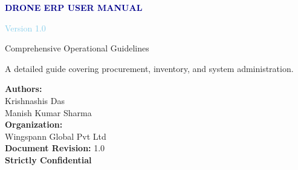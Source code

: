 \documentclass[11pt,a4paper]{article}
\begin{document}
\begin{titlepage}
    \centering
    \vspace*{2cm}
    {\Huge\bfseries\textcolor{darkblue}{DRONE ERP USER MANUAL}\par}
    \vspace{0.5cm}
    {\LARGE\textcolor{skyblue}{Version 1.0}\par}
    \vspace{0.3cm}
    {\large\textcolor{codegray}{Comprehensive Operational Guidelines}\par}
    \vspace{2cm}
    {\large A detailed guide covering procurement, inventory, and system administration.\par}
    \vspace{3cm}

    {\normalsize
        \textbf{Authors:}\\
        Krishnashis Das\\
        Manish Kumar Sharma\\[1em]
        \textbf{Organization:}\\
        Wingspann Global Pvt Ltd\\[1em]
        \textbf{Document Revision:} 1.0\\
        \vspace{0.8cm}
        \LARGE\textcolor{alertred}{\textbf{Strictly Confidential}}
    }
\end{titlepage}

\newpage
\tableofcontents
\newpage





\end{document}
